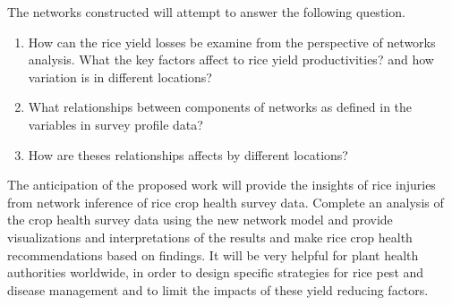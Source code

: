 The networks constructed will attempt to answer the following question. 
\begin{enumerate}

\item How can the rice yield losses be examine from the perspective of networks analysis. What the key factors affect to rice yield productivities? and how variation is in different locations?  
\item What relationships between components of networks as defined in the variables in survey profile data? 
\item How are theses relationships affects by different locations?

\end{enumerate}
The anticipation of the proposed work will provide the insights of rice injuries from network inference of rice crop health survey data. Complete an analysis of the crop health survey data using the new network model and provide visualizations and interpretations of the results and make rice crop health recommendations based on findings. It will be very helpful for plant health authorities worldwide, in order to design specific strategies for rice pest and disease management and to limit the impacts of these yield reducing factors.
 

